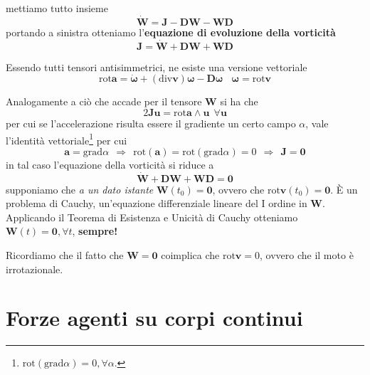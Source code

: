 \documentclass[10pt,a4paper,twoside]{book}
\begin{document}
mettiamo tutto insieme
\begin{equation*}
\dot{\mathbf{W}} =\mathbf{J} -\mathbf{DW} -\mathbf{WD}
\end{equation*}
portando a sinistra otteniamo l'\textbf{equazione di evoluzione della vorticità}
\begin{equation*}
\boxed{\mathbf{J} =\dot{\mathbf{W}} +\mathbf{DW} +\mathbf{WD}}
\end{equation*}
\begin{oss}
Essendo tutti tensori antisimmetrici, ne esiste una versione vettoriale
\begin{equation*}
\mathrm{rot}\mathbf{a} =\dot{\mathbf{\omega }} +(\mathrm{div}\mathbf{v})\mathbf{\omega } -\mathbf{D\omega } \ \ \ \ \mathbf{\omega } =\mathrm{rot}\mathbf{v}
\end{equation*}
\end{oss}
\begin{corollario}
Analogamente a ciò che accade per il tensore $\mathbf{W}$ si ha che
\begin{equation*}
2\mathbf{Ju} =\mathrm{rot}\mathbf{a} \land \mathbf{u} \ \ \forall \mathbf{u}
\end{equation*}
per cui se l'accelerazione risulta essere il gradiente un certo campo $\alpha $, vale l'identità vettoriale\footnote{$\mathrm{rot}(\mathrm{grad} \alpha ) =0,\forall \alpha $.} per cui
\begin{equation*}
\mathbf{a} =\mathrm{grad} \alpha \ \ \Rightarrow \ \ \mathrm{rot}(\mathbf{a}) =\mathrm{rot}(\mathrm{grad} \alpha ) =0\ \ \Rightarrow \ \ \mathbf{J} =\mathbf{0}
\end{equation*}
in tal caso l'equazione della vorticità si riduce a
\begin{equation*}
\dot{\mathbf{W}} +\mathbf{DW} +\mathbf{WD} =\mathbf{0}
\end{equation*}
supponiamo che \textit{a un dato istante} $\mathbf{W}( t_{0}) =\mathbf{0}$, ovvero che $\mathrm{rot}\mathbf{v}( t_{0}) =\mathbf{0}$. È un problema di Cauchy, un'equazione differenziale lineare del I ordine in $\mathbf{W}$. Applicando il Teorema di Esistenza e Unicità di Cauchy otteniamo $\mathbf{W}( t) =\mathbf{0} ,\forall t$, \textbf{sempre!}

Ricordiamo che il fatto che $\mathbf{W} =\mathbf{0}$ coimplica che $\mathrm{rot}\mathbf{v} =0$, ovvero che il moto è irrotazionale.
\end{corollario}
\chapter{Forze agenti su corpi continui}
\end{document}
